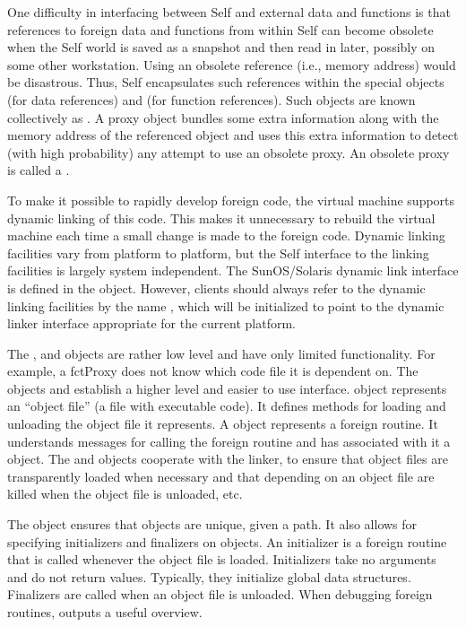 \documentclass[letterpaper,10pt,english]{sphinxmanual}
\begin{document}
One difficulty in interfacing between Self and external data and functions is that references to foreign
data and functions from within Self can become obsolete when the Self world is saved as
a snapshot and then read in later, possibly on some other workstation. Using an obsolete reference
(i.e., memory address) would be disastrous. Thus, Self encapsulates such references within the
special objects  (for data references) and  (for function references). Such objects
are known collectively as . A proxy object bundles some extra information along with the
memory address of the referenced object and uses this extra information to detect (with high probability)
any attempt to use an obsolete proxy. An obsolete proxy is called a .

To make it possible to rapidly develop foreign code, the virtual machine supports dynamic linking
of this code. This makes it unnecessary to rebuild the virtual machine each time a small change is
made to the foreign code. Dynamic linking facilities vary from platform to platform, but the Self
interface to the linking facilities is largely system independent. The SunOS/Solaris dynamic link
interface is defined in the  object. However, clients should always refer to the dynamic
linking facilities by the name , which will be initialized to point to the dynamic linker interface
appropriate for the current platform.

The ,  and  objects are rather low level and have only limited functionality.
For example, a fctProxy does not know which code file it is dependent on. The objects
 and  establish a higher level and easier to use interface. 
object represents an “object file” (a file with executable code). It defines methods for loading
and unloading the object file it represents. A  object represents a foreign routine. It
understands messages for calling the foreign routine and has associated with it a 
object. The  and  objects cooperate with the linker, to ensure that
object files are transparently loaded when necessary and that  depending on an object
file are killed when the object file is unloaded, etc.

The  object ensures that  objects are unique, given a path. It also
allows for specifying initializers and finalizers on  objects. An initializer is a foreign
routine that is called whenever the object file is loaded. Initializers take no arguments and do not
return values. Typically, they initialize global data structures. Finalizers are called when an object
file is unloaded. When debugging foreign routines,  outputs a
useful overview.
\end{document}
